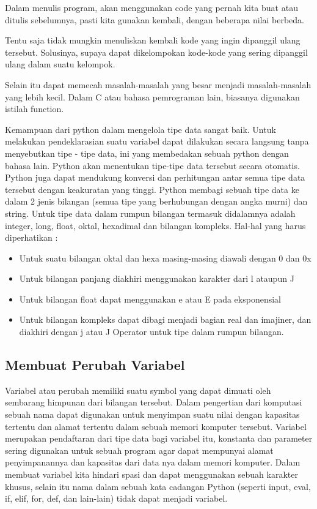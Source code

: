 Dalam menulis program, akan menggunakan code yang pernah kita  buat atau ditulis sebelumnya, pasti
kita gunakan kembali, dengan beberapa nilai berbeda.
 
Tentu saja tidak mungkin menuliskan kembali kode yang ingin dipanggil ulang tersebut.
Solusinya, supaya dapat dikelompokan kode-kode yang sering dipanggil ulang dalam suatu kelompok.

Selain itu dapat memecah masalah-masalah yang besar  menjadi masalah-masalah yang lebih kecil.
Dalam C atau bahasa pemrograman lain, biasanya digunakan istilah function.

Kemampuan dari python dalam mengelola tipe data sangat baik. Untuk melakukan pendeklarasian suatu variabel dapat dilakukan secara langsung tanpa menyebutkan tipe - tipe data, ini yang membedakan sebuah python dengan bahasa lain. Python akan menentukan tipe-tipe data tersebut secara otomatis. Python juga dapat mendukung konversi dan perhitungan antar semua tipe data tersebut dengan keakuratan yang tinggi. Python membagi sebuah tipe data ke dalam 2 jenis bilangan (semua tipe yang berhubungan dengan angka murni) dan string. Untuk tipe data dalam rumpun bilangan termasuk didalamnya adalah integer, long, float, oktal, hexadimal dan bilangan kompleks. Hal-hal yang harus diperhatikan :
\begin{itemize}
\item
Untuk suatu bilangan oktal dan hexa masing-masing diawali dengan 0 dan 0x
\item
Untuk bilangan panjang diakhiri menggunakan karakter dari l ataupun J
\item
Untuk bilangan float dapat menggunakan e atau E pada eksponensial
\item
Untuk bilangan kompleks dapat dibagi menjadi bagian real dan imajiner, dan diakhiri dengan j atau J Operator untuk tipe dalam rumpun bilangan.\cite{utamipemrograman}
\end{itemize}

\subsection{Membuat Perubah Variabel}
Variabel atau perubah memiliki suatu symbol yang dapat dimuati oleh sembarang himpunan dari bilangan tersebut. Dalam pengertian dari komputasi sebuah nama dapat digunakan untuk menyimpan suatu nilai dengan kapasitas tertentu dan alamat tertentu dalam sebuah memori komputer tersebut. Variabel merupakan pendaftaran dari tipe data bagi variabel itu, konstanta dan parameter sering digunakan untuk sebuah program agar dapat mempunyai alamat penyimpanannya dan kapasitas dari data nya dalam memori komputer. Dalam membuat variabel kita hindari spasi dan dapat menggunakan sebuah karakter khusus, selain itu nama dalam sebuah kata cadangan Python (seperti input, eval, if, elif, for, def, dan lain-lain) tidak dapat menjadi variabel.\cite{irfani2016bahan}

